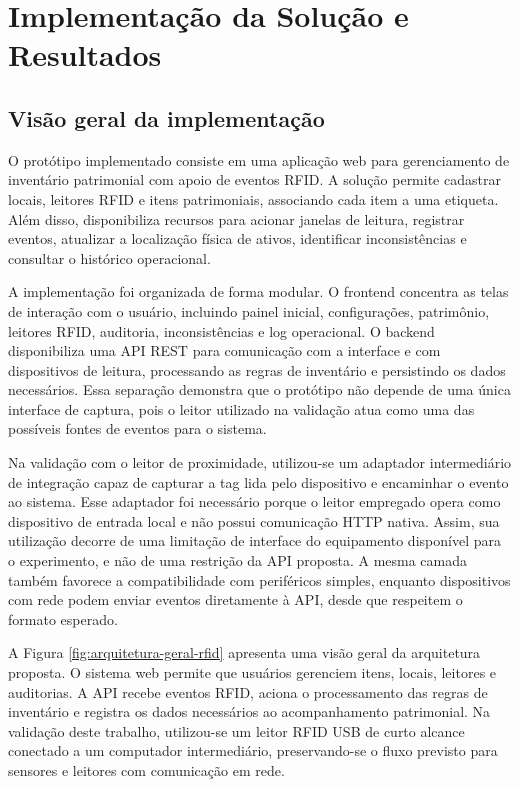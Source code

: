 \chapter{Implementação da Solução e Resultados}

\section{Visão geral da implementação}

O protótipo implementado consiste em uma aplicação web para gerenciamento de inventário patrimonial com apoio de eventos RFID. A solução permite cadastrar locais, leitores RFID e itens patrimoniais, associando cada item a uma etiqueta. Além disso, disponibiliza recursos para acionar janelas de leitura, registrar eventos, atualizar a localização física de ativos, identificar inconsistências e consultar o histórico operacional.

A implementação foi organizada de forma modular. O frontend concentra as telas de interação com o usuário, incluindo painel inicial, configurações, patrimônio, leitores RFID, auditoria, inconsistências e log operacional. O backend disponibiliza uma API REST para comunicação com a interface e com dispositivos de leitura, processando as regras de inventário e persistindo os dados necessários. Essa separação demonstra que o protótipo não depende de uma única interface de captura, pois o leitor utilizado na validação atua como uma das possíveis fontes de eventos para o sistema.

Na validação com o leitor de proximidade, utilizou-se um adaptador intermediário de integração capaz de capturar a tag lida pelo dispositivo e encaminhar o evento ao sistema. Esse adaptador foi necessário porque o leitor empregado opera como dispositivo de entrada local e não possui comunicação HTTP nativa. Assim, sua utilização decorre de uma limitação de interface do equipamento disponível para o experimento, e não de uma restrição da API proposta. A mesma camada também favorece a compatibilidade com periféricos simples, enquanto dispositivos com rede podem enviar eventos diretamente à API, desde que respeitem o formato esperado.

A Figura \ref{fig:arquitetura-geral-rfid} apresenta uma visão geral da arquitetura proposta. O sistema web permite que usuários gerenciem itens, locais, leitores e auditorias. A API recebe eventos RFID, aciona o processamento das regras de inventário e registra os dados necessários ao acompanhamento patrimonial. Na validação deste trabalho, utilizou-se um leitor RFID USB de curto alcance conectado a um computador intermediário, preservando-se o fluxo previsto para sensores e leitores com comunicação em rede.

